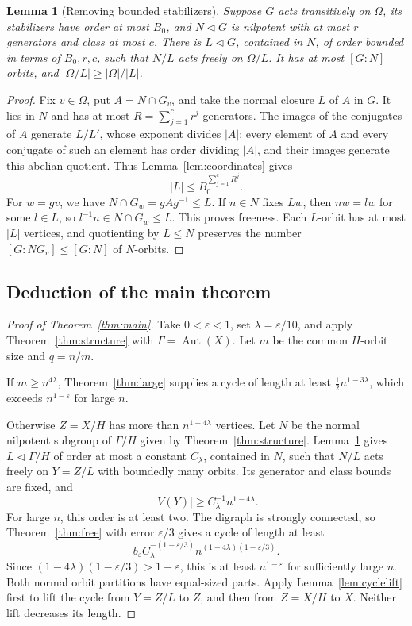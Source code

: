 \documentclass[11pt,a4paper,reqno]{amsart}
\newtheorem{lemma}[theorem]{Lemma}
\theoremstyle{definition}
\theoremstyle{remark}
\numberwithin{equation}{section}
\DeclareMathOperator{\Aut}{Aut}
\newcommand{\eps}{\varepsilon}
\begin{document}
\begin{lemma}[Removing bounded stabilizers]\label{lem:freequotient}
Suppose $G$ acts transitively on $\Omega$, its stabilizers have order at most $B_0$, and $N\lhd G$ is nilpotent with at most $r$ generators and class at most $c$. There is $L\lhd G$, contained in $N$, of order bounded in terms of $B_0,r,c$, such that $N/L$ acts freely on $\Omega/L$. It has at most $[G:N]$ orbits, and $|\Omega/L|\ge |\Omega|/|L|$.
\end{lemma}
\begin{proof}
Fix $v\in\Omega$, put $A=N\cap G_v$, and take the normal closure $L$ of $A$ in $G$. It lies in $N$ and has at most $R=\sum_{j=1}^c r^j$ generators. The images of the conjugates of $A$ generate $L/L'$, whose exponent divides $|A|$: every element of $A$ and every conjugate of such an element has order dividing $|A|$, and their images generate this abelian quotient. Thus Lemma~\ref{lem:coordinates} gives
\[
 |L|\le B_0^{\sum_{j=1}^c R^j}.
\]
For $w=gv$, we have $N\cap G_w=gAg^{-1}\le L$. If $n\in N$ fixes $Lw$, then $nw=lw$ for some $l\in L$, so $l^{-1}n\in N\cap G_w\le L$. This proves freeness. Each $L$-orbit has at most $|L|$ vertices, and quotienting by $L\le N$ preserves the number $[G:NG_v]\le[G:N]$ of $N$-orbits.
\end{proof}

\subsection{Deduction of the main theorem}
\begin{proof}[Proof of Theorem~\ref{thm:main}]
Take $0<\eps<1$, set $\lambda=\eps/10$, and apply Theorem~\ref{thm:structure} with $\Gamma=\Aut(X)$. Let $m$ be the common $H$-orbit size and $q=n/m$.

If $m\ge n^{4\lambda}$, Theorem~\ref{thm:large} supplies a cycle of length at least $\tfrac12 n^{1-3\lambda}$, which exceeds $n^{1-\eps}$ for large $n$.

Otherwise $Z=X/H$ has more than $n^{1-4\lambda}$ vertices. Let $N$ be the normal nilpotent subgroup of $\Gamma/H$ given by Theorem~\ref{thm:structure}. Lemma~\ref{lem:freequotient} gives $L\lhd\Gamma/H$ of order at most a constant $C_\lambda$, contained in $N$, such that $N/L$ acts freely on $Y=Z/L$ with boundedly many orbits. Its generator and class bounds are fixed, and
\[
 |V(Y)|\ge C_\lambda^{-1}n^{1-4\lambda}.
\]
For large $n$, this order is at least two. The digraph is strongly connected, so Theorem~\ref{thm:free} with error $\eps/3$ gives a cycle of length at least
\[
 b_\eps C_\lambda^{-(1-\eps/3)}
 n^{(1-4\lambda)(1-\eps/3)}.
\]
Since $(1-4\lambda)(1-\eps/3)>1-\eps$, this is at least $n^{1-\eps}$ for sufficiently large $n$. Both normal orbit partitions have equal-sized parts. Apply Lemma~\ref{lem:cyclelift} first to lift the cycle from $Y=Z/L$ to $Z$, and then from $Z=X/H$ to $X$. Neither lift decreases its length.
\end{proof}
\end{document}
